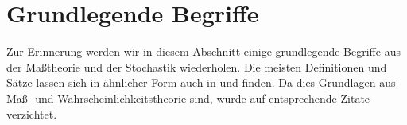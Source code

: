 \section{Grundlegende Begriffe}

Zur Erinnerung werden wir in diesem Abschnitt einige grundlegende Begriffe aus der Maßtheorie und der Stochastik wiederholen. Die meisten Definitionen und Sätze lassen sich in ähnlicher Form auch in \cite{Klenke} und \cite{Meintrup} finden. Da dies Grundlagen aus Maß- und Wahrscheinlichkeitstheorie sind, wurde auf entsprechende Zitate verzichtet.





